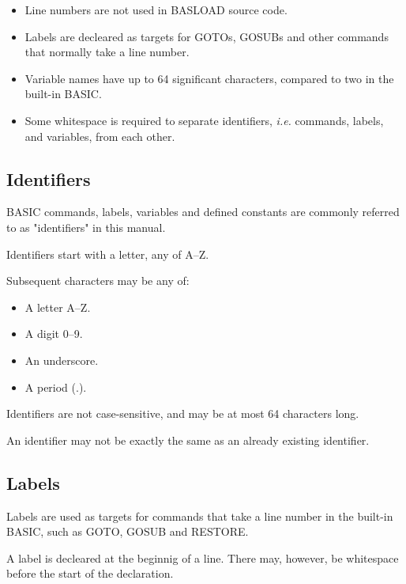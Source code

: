 \documentclass{article}
\begin{document}
        \begin{itemize}
            \item Line numbers are not used in BASLOAD source code.
            \item Labels are decleared as targets for GOTOs, GOSUBs and
                  other commands that normally take a line number.
            \item Variable names have up to 64 significant characters, compared to two
                  in the built-in BASIC.
            \item Some whitespace is required to separate identifiers, 
                  \textit{i.e.} commands, labels, and variables, from each other.
                  
        \end{itemize}
    
    \subsection{Identifiers}

        BASIC commands, labels, variables and defined constants are commonly referred to as "identifiers" in this
        manual.

        Identifiers start with a letter, any of A--Z.

        Subsequent characters may be any of:

        \begin{itemize}
            \item A letter A--Z.
            \item A digit 0--9. 
            \item An underscore. 
            \item A period (.).
        \end{itemize}

        Identifiers are not case-sensitive, and may be at most 64 characters long.

        An identifier may not be exactly the same as an already existing identifier.

    \subsection{Labels}

        Labels are used as targets for commands that take a line number in
        the built-in BASIC, such as GOTO, GOSUB and RESTORE.

        A label is decleared at the beginnig of a line. There may, however,
        be whitespace before the start of the declaration.
\end{document}
